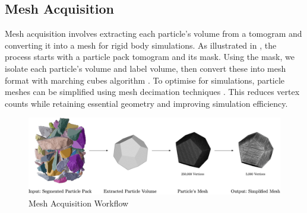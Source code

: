 \documentclass[preprint,12pt]{elsarticle}
\begin{document}
\subsection{Mesh Acquisition}
Mesh acquisition involves extracting each particle's volume from a tomogram and converting it into a mesh for rigid body simulations. 
As illustrated in , the process starts with a particle pack tomogram and its mask. 
Using the mask, we isolate each particle's volume and label volume, then convert these into mesh format with marching cubes algorithm \citep{lorensen1987marching}.
To optimise for simulations, particle meshes can be simplified using mesh decimation techniques \citep{garland1997surface}. 
This reduces vertex counts while retaining essential geometry and improving simulation efficiency.
\begin{figure}[h!]
    \includegraphics[width=\textwidth]{figures/img/mesh-acquisition.png}
    \caption{Mesh Acquisition Workflow}
    \label{fig:mesh_acquisition_workflow}
\end{figure}


\end{document}
